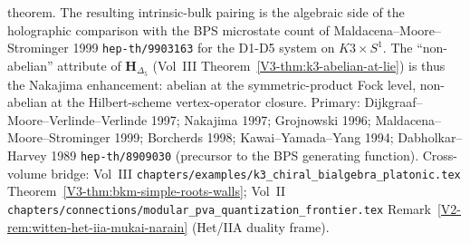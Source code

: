 \begin{remark}
theorem.  The resulting intrinsic-bulk pairing is the algebraic side
of the holographic comparison with the BPS microstate count of
Maldacena--Moore--Strominger 1999 \texttt{hep-th/9903163} for the
D1-D5 system on $K3 \times S^{1}$. The ``non-abelian'' attribute of
$\mathbf{H}_{\Delta_{5}}$ (Vol~III Theorem~\ref{V3-thm:k3-abelian-at-lie})
is thus the Nakajima enhancement: abelian at the symmetric-product
Fock level, non-abelian at the Hilbert-scheme vertex-operator closure.
Primary: Dijkgraaf--Moore--Verlinde--Verlinde 1997; Nakajima 1997;
Grojnowski 1996; Maldacena--Moore--Strominger 1999; Borcherds 1998;
Kawai--Yamada--Yang 1994; Dabholkar--Harvey 1989
\texttt{hep-th/8909030} (precursor to the BPS generating function).
Cross-volume bridge: Vol~III
\texttt{chapters/examples/k3\_chiral\_bialgebra\_platonic.tex}
Theorem~\ref{V3-thm:bkm-simple-roots-walls}; Vol~II
\texttt{chapters/connections/modular\_pva\_quantization\_frontier.tex}
Remark~\ref{V2-rem:witten-het-iia-mukai-narain} (Het/IIA duality frame).
\end{remark}
